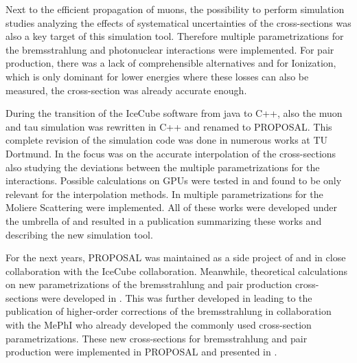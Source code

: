 Next to the efficient propagation of muons, the possibility to perform simulation studies analyzing the effects of systematical uncertainties of the cross-sections was also a key target of this simulation tool.
Therefore multiple parametrizations for the bremsstrahlung and photonuclear interactions were implemented.
For pair production, there was a lack of comprehensible alternatives and for Ionization, which is only dominant for lower energies where these losses can also be measured, the cross-section was already accurate enough.

During the transition of the IceCube software from java to C++, also the muon and tau simulation was rewritten in C++ and renamed to PROPOSAL.
This complete revision of the simulation code was done in numerous works at TU Dortmund.
In \cite{Frantzen11Diplom, Schmitz11Diplom} the focus was on the accurate interpolation of the cross-sections also studying the deviations between the multiple parametrizations for the interactions.
Possible calculations on GPUs were tested in \cite{Fuchs12Master} and found to be only relevant for the interpolation methods.
In \cite{Geiselbrinck13Bachelor} multiple parametrizations for the Moliere Scattering were implemented.
All of these works were developed under the umbrella of \cite{Koehne13PhD} and resulted in a publication \cite{Koehne13PROPOSAL} summarizing these works and describing the new simulation tool.

For the next years, PROPOSAL was maintained as a side project of \cite{Fuchs16PhD} and in close collaboration with the IceCube collaboration.
Meanwhile, theoretical calculations on new parametrizations of the bremsstrahlung and pair production cross-sections were developed in \cite{Menne14Master, Sandrock14Master, Soedingrekso16Master}.
This was further developed in \cite{Sandrock18PhD} leading to the publication \cite{Sandrock18nlo} of higher-order corrections of the bremsstrahlung in collaboration with the MePhI who already developed the commonly used cross-section parametrizations.
These new cross-sections for bremsstrahlung and pair production were implemented in PROPOSAL and presented in \cite{Soedingrekso19ICRC}.

